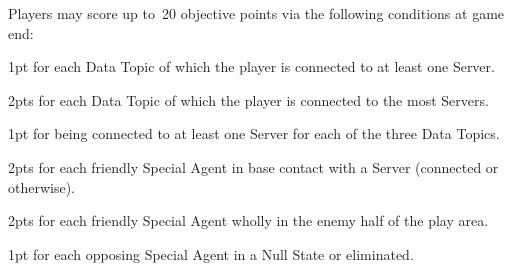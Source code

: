 Players may score up to~20 objective points via the following
conditions at game end:
\begin{squishitemize}
\item 1pt for each Data Topic of which the player is connected to at
  least one Server.
\item 2pts for each Data Topic of which the player is connected to the
  most Servers.
\item 1pt for being connected to at least one Server for each of the
  three Data Topics.

\item 2pts for each friendly Special Agent in base contact with a
  Server (connected or otherwise).
\item 2pts for each friendly Special Agent wholly in the enemy half of the
  play area.
\item 1pt for each opposing Special Agent in a Null State or eliminated.

\end{squishitemize}
